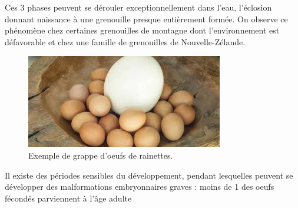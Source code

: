 Ces 3 phases peuvent se dérouler exceptionnellement dans l’eau, l’éclosion donnant naissance à une grenouille presque entièrement formée. 
On observe ce phénomène chez certaines grenouilles de montagne dont l’environnement est défavorable et chez une famille de grenouilles de Nouvelle-Zélande.
        	
\begin{figure}%
	\begin{center}
	\includegraphics[width=.9\textwidth]{laRepro/oeuf.jpg}	
	\caption{Exemple de grappe d'oeufs de rainettes.}%
	\label{fig:autruche}
		\end{center}

\end{figure}

Il existe des périodes sensibles du développement, pendant lesquelles peuvent se développer des malformations embryonnaires graves : moins de 1 des oeufs fécondés parviennent à l’âge adulte